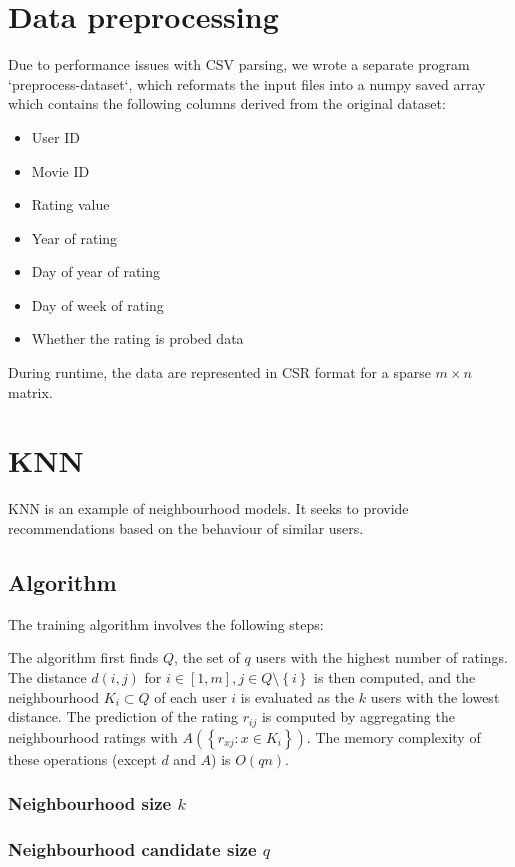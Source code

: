\documentclass[final]{cvpr}
\newcommand{\Set}[1]{\left\{#1\right\}}
\begin{document}
\section{Data preprocessing}
Due to performance issues with CSV parsing, we wrote a separate program `preprocess-dataset`,
which reformats the input files into a numpy saved array
which contains the following columns derived from the original dataset:

\begin{itemize}
	\item User ID
	\item Movie ID
	\item Rating value
	\item Year of rating
	\item Day of year of rating
	\item Day of week of rating
	\item Whether the rating is probed data
\end{itemize}

During runtime, the data are represented in \ac{CSR} format
for a sparse $m \times n$ matrix.

\section{\ac{KNN}}
\ac{KNN} is an example of neighbourhood models.
It seeks to provide recommendations based on the behaviour of similar users.

\subsection{Algorithm}
The training algorithm involves the following steps:

The algorithm first finds $Q$, the set of $q$ users with the highest number of ratings.
The distance $d(i, j)$ for $i \in [1, m], j \in Q \setminus \Set{i}$ is then computed,
and the neighbourhood $K_i \subset Q$ of each user $i$ is evaluated as the $k$ users with the lowest distance.
The prediction of the rating $r_{ij}$ is computed by
aggregating the neighbourhood ratings with $A(\Set{r_{xj} : x \in K_i})$.
The memory complexity of these operations (except $d$ and $A$) is $O(qn)$.


\subsubsection{Neighbourhood size $k$}

\subsubsection{Neighbourhood candidate size $q$}
\end{document}
